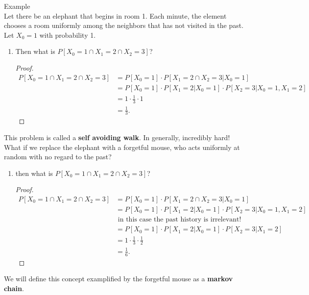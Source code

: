 \documentclass[a4paper]{article}
\begin{document}
  \begin{note}{Example}\\
    Let there be an elephant that begins in room 1. Each minute, the element chooses a room uniformly among the neighbors that has not visited in the past. Let $X_0 =1$ with probability 1.
    \begin{enumerate}
      \item Then what is $P[X_0 = 1 \cap X_1 = 2 \cap X_2 = 3]$?
         \begin{proof}
          \begin{align*}
            P[X_0 = 1 \cap X_1 = 2 \cap X_2 = 3] &= P[X_0 = 1] \cdot P[X_1 = 2 \cap X_2 = 3 | X_0 = 1] \\
                                                 &= P[X_0 = 1] \cdot P[X_1 = 2 | X_0 = 1] \cdot P[X_2 =3 | X_0=1, X_1=2] \\
                                                 &= 1 \cdot \frac{1}{3} \cdot 1 \\
                                                 &= \frac{1}{3}
          .\end{align*}
        \end{proof}
    \end{enumerate}
    This problem is called a \textbf{self avoiding walk}. In generally, incredibly hard!\\
    What if we replace the elephant with a forgetful mouse, who acts uniformly at random with no regard to the past?
    \begin{enumerate}
      \item then what is $P[X_0 = 1 \cap X_1 = 2 \cap X_2 = 3]$?
        \begin{proof}
                    \begin{align*}
            P[X_0 = 1 \cap X_1 = 2 \cap X_2 = 3] &= P[X_0 = 1] \cdot P[X_1 = 2 \cap X_2 = 3 | X_0 = 1] \\
                                                 &= P[X_0 = 1] \cdot P[X_1 = 2 | X_0 = 1] \cdot P[X_2 =3 | X_0=1, X_1=2] \\
                                                 &\text{ in this case the past history is irrelevant!} \\
                                                 &=  P[X_0 = 1] \cdot P[X_1 = 2 | X_0 = 1] \cdot P[X_2 =3 | X_1=2] \\ 
                                                 &= 1 \cdot \frac{1}{3} \cdot \frac{1}{2} \\
                                                 &= \frac{1}{6}
          .\end{align*}
        \end{proof}
    \end{enumerate}
    We will define this concept examplified by the forgetful mouse as a \textbf{markov chain}.
  \end{note}
\end{document}
